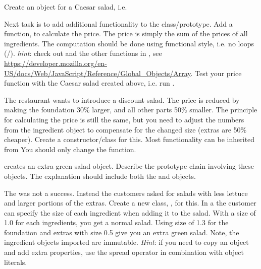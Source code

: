 \documentclass[fleqn, article, a4paper]{memoir}
\begin{document}
\begin{Assignments}
\item Create an object for a Caesar salad, i.e. 

\item Next task is to add additional functionality to the  class/prototype. Add a function,  to calculate the price. The price is simply the sum of the prices of all ingredients. The computation should be done using functional style, i.e. no loops (/). \emph{hint}: check out  and the other functions in , see \url{https://developer.mozilla.org/en-US/docs/Web/JavaScript/Reference/Global_Objects/Array}. Test your price function with the Caesar salad created above, i.e. run .

\item The restaurant wants to introduce a discount salad. The price is reduced by making the foundation 30\% larger, and all other parts 50\% smaller. The principle for calculating the price is still the same, but you need to adjust the numbers from the ingredient object to compensate for the changed size (extras are 50\% cheaper). Create a  constructor/class for this. Most functionality can be inherited from  You should only change the  function.

\item {} creates an extra green salad object. Describe the prototype chain involving these objects. The explanation should include both the  and  objects.

\item The  was not a success. Instead the customers asked for salads with less lettuce and larger portions of the extras. Create a new class, , for this. In a  the customer can specify the size of each ingredient when adding it to the salad. With a size of 1.0 for each ingredients, you get a normal salad. Using size of 1.3 for the foundation and extras with size 0.5 give you an extra green salad. Note, the ingredient objects imported are immutable. \emph{Hint}: if you need to copy an object and add extra properties, use the spread operator in combination with object literals.


\end{Assignments}
\end{document}
